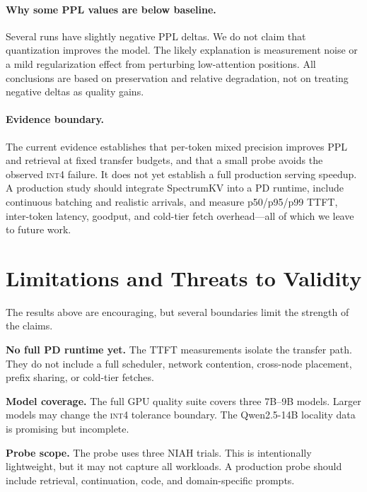 \documentclass[11pt]{article}
\newcommand{\method}{SpectrumKV}
\newcommand{\niah}{NIAH}
\newcommand{\intiv}{\textsc{int4}}
\theoremstyle{plain}
\theoremstyle{definition}
\begin{document}
\paragraph{Why some PPL values are below baseline.}
Several runs have slightly negative PPL deltas.  We do not claim that quantization improves the model.  The likely explanation is measurement noise or a mild regularization effect from perturbing low-attention positions.  All conclusions are based on preservation and relative degradation, not on treating negative deltas as quality gains.

\paragraph{Evidence boundary.}
The current evidence establishes that per-token mixed precision improves PPL and retrieval at fixed transfer budgets, and that a small probe avoids the observed \intiv{} failure.  It does not yet establish a full production serving speedup.  A production study should integrate \method{} into a PD runtime, include continuous batching and realistic arrivals, and measure p50/p95/p99 TTFT, inter-token latency, goodput, and cold-tier fetch overhead---all of which we leave to future work.

\section{Limitations and Threats to Validity}
\label{sec:limitations}

The results above are encouraging, but several boundaries limit the strength of the claims.

\textbf{No full PD runtime yet.}  The TTFT measurements isolate the transfer path.  They do not include a full scheduler, network contention, cross-node placement, prefix sharing, or cold-tier fetches.

\textbf{Model coverage.}  The full GPU quality suite covers three 7B--9B models.  Larger models may change the \intiv{} tolerance boundary.  The Qwen2.5-14B locality data is promising but incomplete.

\textbf{Probe scope.}  The probe uses three \niah{} trials.  This is intentionally lightweight, but it may not capture all workloads.  A production probe should include retrieval, continuation, code, and domain-specific prompts.
\end{document}
